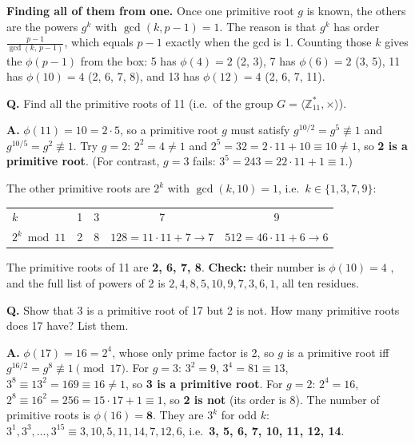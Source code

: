 \textbf{Finding all of them from one.} Once one primitive root $g$ is known, the others are the powers $g^k$ with $\gcd(k, p-1) = 1$. The reason is that $g^k$ has order $\frac{p-1}{\gcd(k,\,p-1)}$, which equals $p - 1$ exactly when the gcd is 1. Counting those $k$ gives the $\phi(p-1)$ from the box: 5 has $\phi(4) = 2$ (2, 3), 7 has $\phi(6) = 2$ (3, 5), 11 has $\phi(10) = 4$ (2, 6, 7, 8), and 13 has $\phi(12) = 4$ (2, 6, 7, 11).

\begin{worked}
\textbf{Q.} Find all the primitive roots of 11 (i.e.\ of the group $G = \langle \mathbb{Z}_{11}^*, \times \rangle$).

\textbf{A.} $\phi(11) = 10 = 2 \cdot 5$, so a primitive root $g$ must satisfy $g^{10/2} = g^5 \not\equiv 1$ and $g^{10/5} = g^2 \not\equiv 1$. Try $g = 2$: $2^2 = 4 \ne 1$ and $2^5 = 32 = 2\cdot11 + 10 \equiv 10 \ne 1$, so \textbf{2 is a primitive root}. (For contrast, $g = 3$ fails: $3^5 = 243 = 22 \cdot 11 + 1 \equiv 1$.)

The other primitive roots are $2^k$ with $\gcd(k, 10) = 1$, i.e.\ $k \in \{1, 3, 7, 9\}$:
\begin{center}\small
\begin{tabular}{@{}lcccc@{}}
\toprule
$k$ & 1 & 3 & 7 & 9\\
$2^k \bmod 11$ & 2 & 8 & $128 = 11\cdot11 + 7 \to 7$ & $512 = 46\cdot11 + 6 \to 6$\\
\bottomrule
\end{tabular}
\end{center}
The primitive roots of 11 are \textbf{2, 6, 7, 8}. \textbf{Check:} their number is $\phi(10) = 4$ \checkmark, and the full list of powers of 2 is $2, 4, 8, 5, 10, 9, 7, 3, 6, 1$, all ten residues.
\end{worked}

\begin{worked}
\textbf{Q.} Show that 3 is a primitive root of 17 but 2 is not. How many primitive roots does 17 have? List them.

\textbf{A.} $\phi(17) = 16 = 2^4$, whose only prime factor is 2, so $g$ is a primitive root iff $g^{16/2} = g^8 \not\equiv 1 \pmod{17}$.
For $g = 3$: $3^2 = 9$, $3^4 = 81 \equiv 13$, $3^8 \equiv 13^2 = 169 \equiv 16 \ne 1$, so \textbf{3 is a primitive root}.
For $g = 2$: $2^4 = 16$, $2^8 \equiv 16^2 = 256 = 15\cdot17 + 1 \equiv 1$, so \textbf{2 is not} (its order is 8).
The number of primitive roots is $\phi(16) = \mathbf{8}$. They are $3^k$ for odd $k$: $3^1, 3^3, \dots, 3^{15} \equiv 3, 10, 5, 11, 14, 7, 12, 6$, i.e.\ \textbf{3, 5, 6, 7, 10, 11, 12, 14}.
\end{worked}

